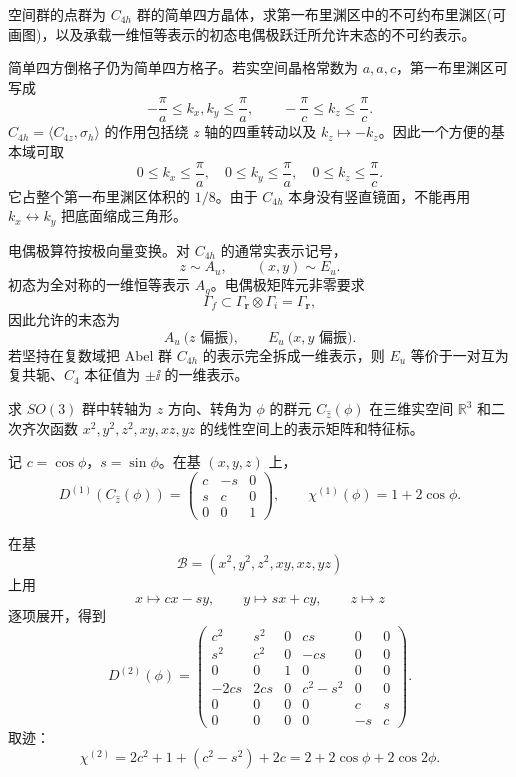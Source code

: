 \begin{question}[10 分]
空间群的点群为 $C_{4h}$ 群的简单四方晶体，求第一布里渊区中的不可约布里渊区(可画图)，以及承载一维恒等表示的初态电偶极跃迁所允许末态的不可约表示。
\begin{solution}
简单四方倒格子仍为简单四方格子。若实空间晶格常数为 $a,a,c$，第一布里渊区可写成
\[
-\frac{\pi}{a}\le k_x,k_y\le\frac{\pi}{a},
\qquad
-\frac{\pi}{c}\le k_z\le\frac{\pi}{c}.
\]
$C_{4h}=\langle C_{4z},\sigma_h\rangle$ 的作用包括绕 $z$ 轴的四重转动以及 $k_z\mapsto-k_z$。因此一个方便的基本域可取
\[
\boxed{0\le k_x\le\frac{\pi}{a},\quad
0\le k_y\le\frac{\pi}{a},\quad
0\le k_z\le\frac{\pi}{c}}.
\]
它占整个第一布里渊区体积的 $1/8$。由于 $C_{4h}$ 本身没有竖直镜面，不能再用 $k_x\leftrightarrow k_y$ 把底面缩成三角形。

电偶极算符按极向量变换。对 $C_{4h}$ 的通常实表示记号，
\[
z\sim A_u,\qquad (x,y)\sim E_u.
\]
初态为全对称的一维恒等表示 $A_g$。电偶极矩阵元非零要求
\[
\Gamma_f\subset \Gamma_{\mathbf r}\otimes\Gamma_i=\Gamma_{\mathbf r},
\]
因此允许的末态为
\[
\boxed{A_u\ \text{($z$ 偏振)}},\qquad
\boxed{E_u\ \text{($x,y$ 偏振)}}.
\]
若坚持在复数域把 Abel 群 $C_{4h}$ 的表示完全拆成一维表示，则 $E_u$ 等价于一对互为复共轭、$C_4$ 本征值为 $\pm\ii$ 的一维表示。
\end{solution}
\end{question}

\begin{question}[10 分]
求 $SO(3)$ 群中转轴为 $z$ 方向、转角为 $\phi$ 的群元 $C_{\hat z}(\phi)$ 在三维实空间 $\mathbb R^3$ 和二次齐次函数 $x^2,y^2,z^2,xy,xz,yz$ 的线性空间上的表示矩阵和特征标。
\begin{solution}
记 $c=\cos\phi$，$s=\sin\phi$。在基 $(x,y,z)$ 上，
\[
D^{(1)}(C_{\hat z}(\phi))=
\begin{pmatrix}
c&-s&0\\
s&c&0\\
0&0&1
\end{pmatrix},
\qquad
\boxed{\chi^{(1)}(\phi)=1+2\cos\phi}.
\]

在基
\[
\mathcal B=(x^2,y^2,z^2,xy,xz,yz)
\]
上用
\[
x\mapsto cx-sy,\qquad y\mapsto sx+cy,\qquad z\mapsto z
\]
逐项展开，得到
\[
D^{(2)}(\phi)=
\begin{pmatrix}
c^2&s^2&0&cs&0&0\\
s^2&c^2&0&-cs&0&0\\
0&0&1&0&0&0\\
-2cs&2cs&0&c^2-s^2&0&0\\
0&0&0&0&c&s\\
0&0&0&0&-s&c
\end{pmatrix}.
\]
取迹：
\[
\chi^{(2)}=2c^2+1+(c^2-s^2)+2c
=\boxed{2+2\cos\phi+2\cos2\phi}.
\]
\end{solution}
\end{question}

